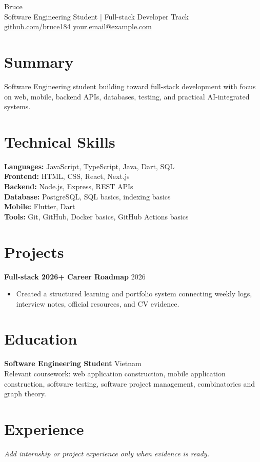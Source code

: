 \documentclass[10pt,a4paper]{article}
\begin{document}
\begin{center}
    {\LARGE Bruce}\\
    Software Engineering Student | Full-stack Developer Track\\
    \href{https://github.com/bruce184}{github.com/bruce184} \quad
    \href{mailto:your.email@example.com}{your.email@example.com}
\end{center}

\section*{Summary}
Software Engineering student building toward full-stack development with focus on web, mobile, backend APIs, databases, testing, and practical AI-integrated systems.

\section*{Technical Skills}
\textbf{Languages:} JavaScript, TypeScript, Java, Dart, SQL\\
\textbf{Frontend:} HTML, CSS, React, Next.js\\
\textbf{Backend:} Node.js, Express, REST APIs\\
\textbf{Database:} PostgreSQL, SQL basics, indexing basics\\
\textbf{Mobile:} Flutter, Dart\\
\textbf{Tools:} Git, GitHub, Docker basics, GitHub Actions basics

\section*{Projects}
\textbf{Full-stack 2026+ Career Roadmap} \hfill 2026\\
\begin{itemize}
    \item Created a structured learning and portfolio system connecting weekly logs, interview notes, official resources, and CV evidence.
\end{itemize}

\section*{Education}
\textbf{Software Engineering Student} \hfill Vietnam\\
Relevant coursework: web application construction, mobile application construction, software testing, software project management, combinatorics and graph theory.

\section*{Experience}
\textit{Add internship or project experience only when evidence is ready.}
\end{document}
